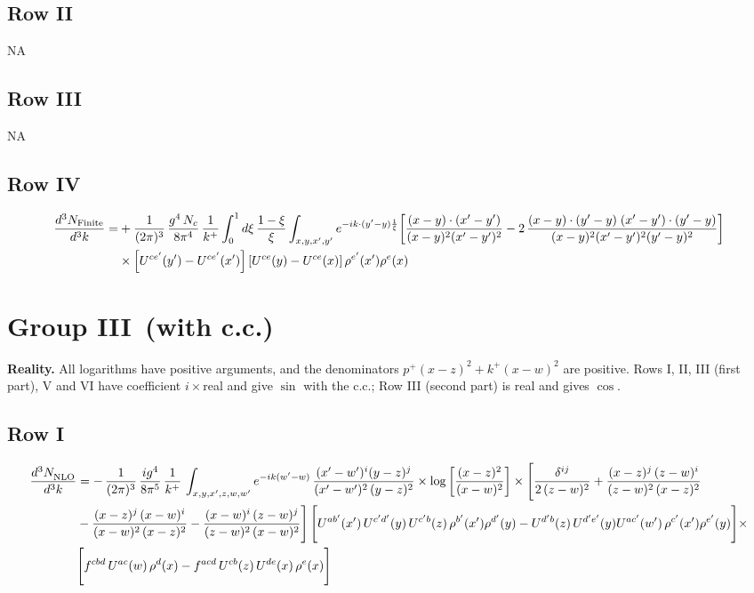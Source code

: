 \documentclass[9pt]{article}
\numberwithin{equation}{section}
\begin{document}
\subsection{Row II}
\textsc{NA}
\subsection{Row III}
\textsc{NA}
\subsection{Row IV}
\begin{align}
\frac{d^{3}N_{\rm Finite}}{d^{3}k}= &  +\frac{1}{(2\pi)^{3}}\,\frac{g^{4}\,N_{c}}{8\pi^{4}}\,\frac{1}{k^{+}}\int_{0}^{1}d\xi\,\frac{1-\xi}{\xi}\int_{x,y,x',y'}e^{-ik\cdot(y'-y)\frac{1}{\xi}}\bigg[\frac{(x-y)\cdot(x'-y')}{(x-y)^{2}(x'-y')^{2}}-2\,\frac{(x-y)\cdot(y'-y)\;(x'-y')\cdot(y'-y)}{(x-y)^{2}(x'-y')^{2}(y'-y)^{2}}\bigg]\notag\\
&\times\left[U^{ce'}(y') - U^{ce'}(x')\right]\left[U^{ce}(y) - U^{ce}(x)\right]\rho^{e'}(x')\rho^{e}(x)
\end{align}
\section{Group III\, (with c.c.)}
{\color{red}\textbf{Reality.} All logarithms have positive arguments, and the denominators $p^{+}(x-z)^{2}+k^{+}(x-w)^{2}$ are positive. Rows I, II, III (first part), V and VI have coefficient $i\times$real and give $\sin$ with the c.c.; Row III (second part) is real and gives $\cos$.}
\subsection{Row I}
\begin{align}
     \frac{d^{3}N_{\rm NLO}^{\rm}}{d^{3}k}  & =   -\,\frac{1}{(2\pi)^{3}}\, \frac{ig^{4}}{8\pi^{5}}\,\frac{1}{k^{+}}\,\int_{x,y,x',z,w,w^{\prime}} e^{-ik(w^{\prime}-w)}\,\frac{(x'-w')^{i}(y-z)^{j}}{(x'-w')^{2}\,(y-z)^{2}}\times \log{\left[\frac{(x-z)^{2}}{(x-w)^{2}}\right]}\times \Bigg[\frac{\delta^{ij}}{2\,(z-w)^{2}}+\frac{(x-z)^{j}\,(z-w)^{i}}{(z-w)^{2}\,(x-z)^{2}}\notag \\ & -\frac{(x-z)^{j}\,(x-w)^{i}}{(x-w)^{2}\,(x-z)^{2}}-\frac{(x-w)^{i}\,(z-w)^{j}}{(z-w)^{2}\,(x-w)^{2}}\Bigg]\, \Bigg[U^{ab'}(x')\,U^{c'd'}(y)\,U^{c'b}(z)\,\rho^{b'}(x')\rho^{d'}(y)-U^{d'b}(z)\,U^{d'e'}(y)U^{ac'}(w')\,\rho^{c'}(x')\rho^{e'}(y)\Bigg]\times\notag \\ & \Bigg[f^{cbd}\,U^{ac}(w)\,\rho^{d}(x)-f^{acd}\, U^{cb}(z)\,U^{de}(x)\,\rho^{e}(x)\Bigg]
\end{align}
\end{document}
